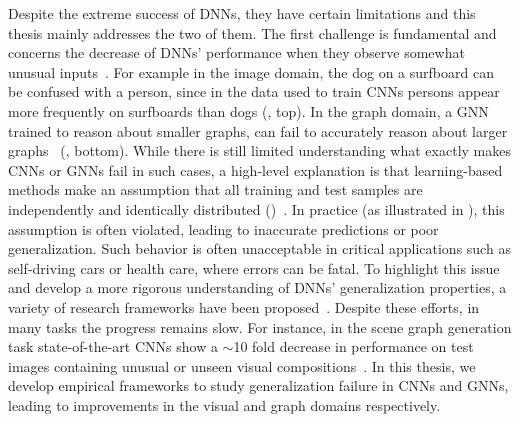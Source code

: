 Despite the extreme success of DNNs, they have certain limitations and this thesis mainly addresses the two of them. The first challenge is fundamental and concerns the decrease of DNNs' performance when they observe somewhat unusual inputs~\citep{hendrycks2019benchmarking,galloway2019batch,szegedy2013intriguing}. For example in the image domain, the dog on a surfboard can be confused with a person, since in the data used to train CNNs persons appear more frequently on surfboards than dogs (\fig{\ref{fig:intro_generalization}}, top). In the graph domain, a GNN trained to reason about smaller graphs, can fail to accurately reason about larger graphs~\citep{yehudai2021local} (\fig{\ref{fig:intro_generalization}}, bottom).
While there is still limited understanding what exactly makes CNNs or GNNs fail in such cases, a high-level explanation is that learning-based methods make an assumption that all training and test samples are independently and identically distributed (\IID)~\citep{shen2021towards}. In practice (as illustrated in \fig{\ref{fig:intro_generalization}}), this assumption is often violated, leading to inaccurate predictions or poor generalization. 
Such behavior is often unacceptable in critical applications such as self-driving cars or health care, where errors can be fatal.
To highlight this issue and develop a more rigorous understanding of DNNs' generalization properties, a variety of research frameworks have been proposed~\citep{lust2020survey,shen2021towards,hendrycks2019benchmarking,hupkes2019compositionality,garg2020generalization}. Despite these efforts, in many tasks the progress remains slow. For instance, in the scene graph generation task state-of-the-art CNNs show a $\sim$10 fold decrease in performance on test images containing unusual or unseen visual compositions~\citep{tang2020unbiased,knyazev2020graph,suhail2021energy}. In this thesis, we develop empirical frameworks to study generalization failure in CNNs and GNNs, leading to improvements in the visual and graph domains respectively.

